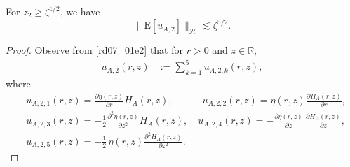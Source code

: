 \documentclass[12pt,a4paper]{article}
\newcommand{\R}{{\mathbb{R}}}
\newcommand{\E}{\mathrm{E}}
\newcommand {\deltah}{{\zeta}}
\newcommand{\<}{\langle}
\renewcommand{\>}{\rangle}
\begin{document}
  
 \begin{lemma}\label{rd07_02l1}
 For $z_2\geq \deltah^{1/2}$,  we have
 \begin{equation} \label{equ3}
 \|\E[u_{A,2}]\|_{\mathcal{H}} \lesssim \deltah^{5/2}.
 \end{equation}
 \end{lemma}
 
 \begin{proof}
 Observe from \eqref{rd07_01e2} that for $r>0$ and $z\in \R$,
 \begin{align*} %
 u_{A,2}(r,z)& :=\sum_{k=1}^5 u_{A,2,k}(r,z),
 \end{align*}
 where
 \begin{align} \nonumber
& u_{A,2,1}(r,z) =  \frac{\partial \eta(r,z)}{\partial r}H_A(r,z) , \qquad\quad u_{A,2,2}(r,z) = \eta(r, z)\frac{\partial H_A(r,z)}{\partial r} , \\  \nonumber
&u_{A,2,3}(r,z) = -\frac12 \frac{\partial^2\eta(r,z)}{\partial z^2}H_A(r,z), \quad
 u_{A,2,4}(r,z) = -\frac{\partial \eta(r,z)}{\partial z}\,  \frac{\partial H_A(r,z)}{\partial z}, \\
 &u_{A,2,5}(r,z) = -\frac12\, \eta(r,z)\frac{\partial^2H_A(r,z)}{\partial z^2}.
 \label{for8}
 \end{align}



\end{proof}
\end{document}
